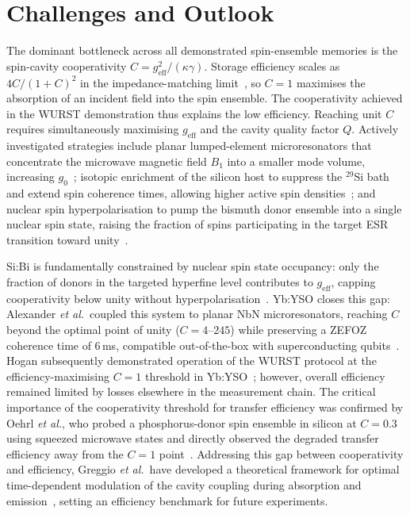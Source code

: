 \documentclass[technote]{IEEEtran}
\begin{document}
\section{Challenges and Outlook}
\label{sec:outlook}

The dominant bottleneck across all demonstrated spin-ensemble memories is the spin-cavity cooperativity $C = g_\mathrm{eff}^2 / (\kappa\gamma)$. Storage efficiency scales as $4C/(1+C)^2$ in the impedance-matching limit~\cite{Afzelius_2013}, so $C = 1$ maximises the absorption of an incident field into the spin ensemble. The cooperativity achieved in the WURST demonstration thus explains the low efficiency. Reaching unit $C$ requires simultaneously maximising $g_\mathrm{eff}$ and the cavity quality factor $Q$. Actively investigated strategies include planar lumped-element microresonators that concentrate the microwave magnetic field $B_1$ into a smaller mode volume, increasing $g_0$~\cite{O_sullivan_2020}; isotopic enrichment of the silicon host to suppress the $^{29}$Si bath and extend spin coherence times, allowing higher active spin densities~\cite{wolfowicz2013}; and nuclear spin hyperpolarisation to pump the bismuth donor ensemble into a single nuclear spin state, raising the fraction of spins participating in the target ESR transition toward unity~\cite{morley2010}.

Si:Bi is fundamentally constrained by nuclear spin state occupancy: only the fraction of donors in the targeted hyperfine level contributes to $g_\mathrm{eff}$, capping cooperativity below unity without hyperpolarisation~\cite{O_sullivan_2020}. Yb:YSO closes this gap: Alexander \textit{et al.}\ coupled this system to planar NbN microresonators, reaching $C$ beyond the optimal point of unity ($C=4$--$245$) while preserving a ZEFOZ coherence time of 6\,ms, compatible out-of-the-box with superconducting qubits~\cite{alexander2022}. Hogan subsequently demonstrated operation of the WURST protocol at the efficiency-maximising $C=1$ threshold in Yb:YSO~\cite{hogan2026}; however, overall efficiency remained limited by losses elsewhere in the measurement chain. The critical importance of the cooperativity threshold for transfer efficiency was confirmed by Oehrl \textit{et al.}, who probed a phosphorus-donor spin ensemble in silicon at $C = 0.3$ using squeezed microwave states and directly observed the degraded transfer efficiency away from the $C = 1$ point~\cite{oehrl2025}. Addressing this gap between cooperativity and efficiency, Greggio \textit{et al.}\ have developed a theoretical framework for optimal time-dependent modulation of the cavity coupling during absorption and emission~\cite{greggio2026}, setting an efficiency benchmark for future experiments.
\end{document}

